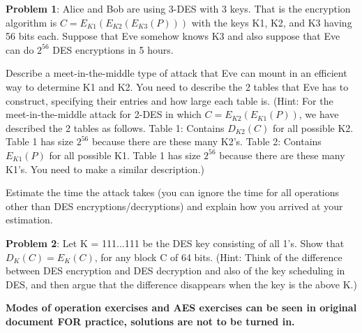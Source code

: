 \documentclass[12pt,letterpaper,final]{report}
\begin{document}

\vline


\noindent\textbf{Problem 1}: Alice and Bob are using 3-DES with 3 keys. That is the encryption algorithm is $C = E_{K1} (E_{K2} (E_{K3} (P)))$ with the keys K1, K2, and K3 having 56 bits each. Suppose that Eve somehow knows K3 and also suppose that Eve can do $2^{56}$ DES encryptions in 5 hours. 
\begin{alphalist}
	\item Describe a meet-in-the-middle type of attack that Eve can mount in an efficient way to determine K1 and K2. You need to describe the 2  tables that Eve has to construct, specifying their entries and how large each table is. (Hint: For the meet-in-the-middle attack for 2-DES in which $C = E_{K2} (E_{K1} (P))$, we have described the 2 tables as follows. Table 1: Contains $D_{K2}(C)$ for all possible K2. Table 1 has size $2^{56}$ because there are these many K2's. Table 2: Contains $E_{K1}(P)$ for all possible K1. Table 1 has size $2^{56}$ because there are these many K1's. You need to make a similar description.)
	\item Estimate the time the attack takes (you can ignore the time for all operations other than DES encryptions/decryptions) and explain how you arrived at your estimation.
\end{alphalist}

\bigskip
\noindent\textbf{Problem 2}: Let K = 111...111 be the DES key consisting of all 1's.  Show that  $D_{K}(C) = E_{K}(C)$,  for any block C of 64 bits. (Hint: Think of the difference between DES encryption and DES decryption and also of the key scheduling in DES, and then argue that the difference disappears when the key is the above K.)

\bigskip
\indent\textbf{Modes of operation exercises and AES exercises can be seen in original document FOR practice, solutions are not to be turned in.}
\end{document}
